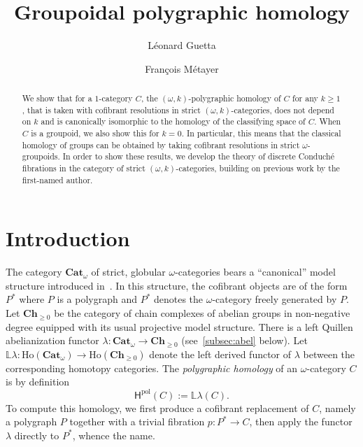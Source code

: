 \documentclass[reqno]{amsart}
\title{Groupoidal polygraphic homology}
\author{Léonard Guetta}
\author{Fran\c{c}ois M\'etayer}
\theoremstyle{plain}
\theoremstyle{definition}
\theoremstyle{remark}
\newcommand{\pair}[2]{(#1,#2)}       %
\newcommand{\ctg}[1]{\mathbf{#1}}  %
\newcommand{\Cat}{\ctg{Cat}}   %
\newcommand{\nCat}[1]{\Cat_{#1}}  %
\newcommand{\oCat}{\nCat{\omega}} %
\newcommand{\Ch}[1]{\ctg{Ch}_{#1}} %
\newcommand{\Chp}{\Ch{\geq 0}} %
\newcommand{\functor}[1]{\mathsf{#1}} %
\newcommand{\abel}{\functor{\lambda}} %
\newcommand{\frcat}[1]{#1^*} %
\newcommand{\oo}{\ensuremath{\omega}}
\newcommand{\ook}[1]{\ensuremath{\pair{\omega}{#1}}}
\newcommand{\Ho}{\functor{H}} %
\newcommand{\LL}{\mathbb{L}} %
\newcommand{\Hopol}{\Ho^{\mathrm{pol}}}%
\newcommand{\Loc}[1]{\mathrm{Ho}(#1)} %
\begin{document}
\begin{abstract} 
We show that for a $1$-category $C$, the \ook k-polygraphic homology
of $C$ for any $k\geq 1$, that is taken with cofibrant resolutions in strict \ook
k-categories, does not depend on $k$ and is canonically isomorphic to
the homology of the classifying space of $C$. When $C$ is a groupoid,
we also show this for $k=0$. In particular, this means that the
classical homology of groups can be obtained by taking cofibrant
resolutions in strict \oo-groupoids.
In order to show these results, we develop the theory of discrete
Conduché fibrations in the category of strict \ook k-categories,
building on previous work by the first-named author.
\end{abstract}

\maketitle

\section{Introduction}\label{sec:intro}

The category $\oCat$ of strict, globular $\oo$-categories bears a
``canonical'' model structure introduced
in~\cite{lafontetal:folkms}. In this structure, the cofibrant objects
are of the form $\frcat P$ where $P$ is a polygraph
and $\frcat P$ denotes the \oo-category
freely generated by $P$. Let $\Chp$ be the category of chain complexes
of abelian groups in non-negative degree equipped with its usual
projective model structure. There is a left Quillen abelianization
functor $\abel:\oCat\to \Chp$ (see~\ref{subsec:abel} below). Let $\LL\abel:\Loc{\oCat}\to\Loc{\Chp}$ denote the
left derived functor of $\abel$ between the corresponding homotopy
categories. The {\em polygraphic homology} of an \oo-category $C$
is by definition
\[\Hopol(C):=\LL\abel(C).\]
To compute this homology, we first produce
a cofibrant replacement of $C$, namely a polygraph $P$ together with 
a trivial fibration $p:\frcat P\to C$, then apply the functor $\abel$
directly to $\frcat P$, whence the name.
\end{document}

